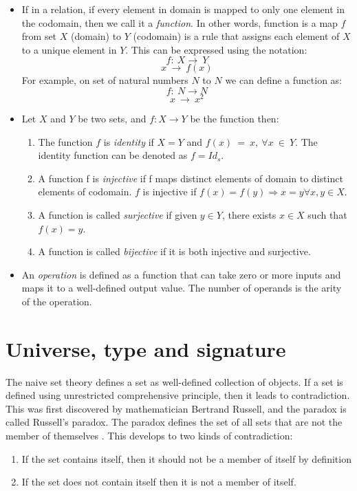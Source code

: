 \begin{itemize}
\item If in a relation, if every element in domain is mapped to only one element in
the codomain, then we call it a \emph{function}. In other words, function is a
map $f$ from set $X$ (domain) to $Y$ (codomain) is a rule that assigns each
element of $X$ to a unique element in $Y$. This can be expressed using the notation:
\[f:\ X \rightarrow\ Y\]
\[x \ \rightarrow\ f(x)\]
For example, on set of natural numbers $N$ to $N$ we can define a function as:
\[f:\ N \rightarrow N\]
\[x \ \rightarrow\ x^{2}\]   
\item Let $ X $ and $ Y $ be two sets, and $ f:X \rightarrow Y$ be the function then:
\begin{enumerate}
    \item The function $f$ is \textit{identity} if $X=Y$ and $f(x)\ =\ x,\ \forall x\ \in
    \ Y$. The identity function can be denoted as $f=Id_s$.
    \item A function f is \emph{injective} if f maps distinct elements of domain to
    distinct elements of codomain. $f$ is injective if $f(x)=f(y) \Rightarrow x = y \forall x,y \in X.$
    \item A function is called \emph{surjective} if given $y \in Y$, there
    exists $x\in X$ such that $f(x) = y$.
    \item A function is called \emph{bijective} if it is both injective and surjective.
\end{enumerate}
\item An \emph{operation} is defined as a function that can take zero or more inputs
and maps it to a well-defined output value. The number of operands is the arity
of the operation.
\end{itemize}

\section{Universe, type and signature}
The naive set theory defines a set as well-defined collection of objects. If a
set is defined using unrestricted comprehensive
principle\cite{enwiki:1125383109}, then it leads to contradiction. This was
first discovered by mathematician Bertrand Russell, and the paradox is called
Russell's paradox. The paradox defines the set of all sets that are not the
member of themselves \cite{russelPara}. This develops to two kinds of
contradiction:
\begin{enumerate}
\item If the set contains itself, then it should not be a member of itself by
definition
\item If the set does not contain itself then it is not a member of itself.
\end{enumerate}

